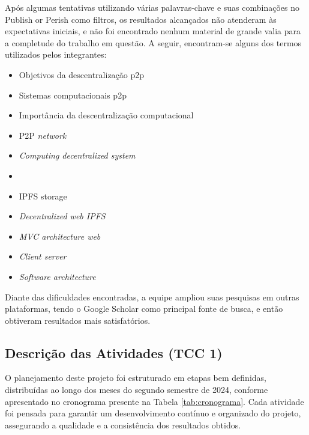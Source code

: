 Após algumas tentativas utilizando várias palavras-chave e suas combinações no Publish or Perish como filtros, os resultados alcançados não atenderam às expectativas iniciais, e não foi encontrado nenhum material de grande valia para a completude do trabalho em questão. A seguir, encontram-se alguns dos termos utilizados pelos integrantes: 

\begin{itemize}
    \item Objetivos da descentralização p2p
    \item Sistemas computacionais p2p
    \item Importância da descentralização computacional
    \item P2P \textit{network}
    \item \textit{Computing decentralized system}
    \item {}
    \item IPFS storage
    \item \textit{Decentralized web IPFS}
    \item \textit{MVC architecture web}
    \item \textit{Client server}
    \item \textit{Software architecture}
\end{itemize}

Diante das dificuldades encontradas, a equipe ampliou suas pesquisas em outras plataformas, tendo o Google Scholar como principal fonte de busca, e então obtiveram resultados mais satisfatórios. 

\subsection{Descrição das Atividades (TCC 1)}
O planejamento deste projeto foi estruturado em etapas bem definidas, distribuídas ao longo dos meses do segundo semestre de 2024, conforme apresentado no cronograma presente na Tabela \ref{tab:cronograma}. Cada atividade foi pensada para garantir um desenvolvimento contínuo e organizado do projeto, assegurando a qualidade e a consistência dos resultados obtidos.


